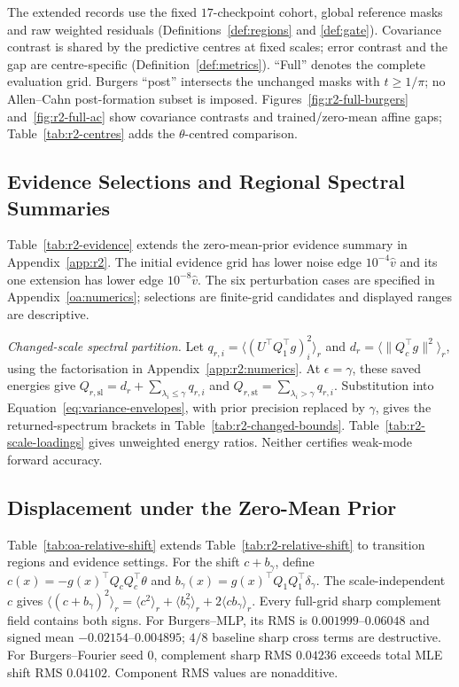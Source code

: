 The extended records use the fixed $17$-checkpoint cohort, global reference
masks and raw weighted residuals (Definitions~\ref{def:regions} and
\ref{def:gate}). Covariance contrast is shared by the predictive centres at fixed scales;
error contrast and the gap are centre-specific (Definition~\ref{def:metrics}).
``Full'' denotes the complete evaluation grid. Burgers ``post'' intersects the unchanged
masks with $t\ge1/\pi$; no Allen--Cahn post-formation subset is imposed.
Figures~\ref{fig:r2-full-burgers} and~\ref{fig:r2-full-ac} show covariance contrasts and
trained/zero-mean affine gaps; Table~\ref{tab:r2-centres} adds the $\theta$-centred comparison.

\subsection{Evidence Selections and Regional Spectral Summaries}
Table~\ref{tab:r2-evidence} extends the zero-mean-prior evidence summary in Appendix~\ref{app:r2}.
The initial evidence grid has lower noise edge $10^{-4}\widehat v$ and its one
extension has lower edge $10^{-8}\widehat v$. The six perturbation cases are specified in Appendix~\ref{oa:numerics}; selections
are finite-grid candidates and displayed ranges are descriptive.

\emph{Changed-scale spectral partition.}
Let $q_{r,i}=\langle(U^\top Q_1^\top g)_i^2\rangle_r$ and
$d_r=\langle\|Q_c^\top g\|^2\rangle_r$, using the factorisation in Appendix~\ref{app:r2:numerics}.
At $\epsilon=\gamma$, these saved energies give
$Q_{r,\mathrm{sl}}=d_r+\sum_{\lambda_i\le\gamma}q_{r,i}$ and
$Q_{r,\mathrm{st}}=\sum_{\lambda_i>\gamma}q_{r,i}$.
Substitution into Equation~\eqref{eq:variance-envelopes}, with prior precision
replaced by $\gamma$, gives the returned-spectrum brackets in
Table~\ref{tab:r2-changed-bounds}. Table~\ref{tab:r2-scale-loadings} gives unweighted
energy ratios. Neither certifies weak-mode forward accuracy.


\subsection{Displacement under the Zero-Mean Prior}
Table~\ref{tab:oa-relative-shift} extends Table~\ref{tab:r2-relative-shift} to transition
regions and evidence settings.
For the shift $c+b_\gamma$, define $c(x)=-g(x)^\top Q_cQ_c^\top\theta$ and
$b_\gamma(x)=g(x)^\top Q_1Q_1^\top\delta_\gamma$. The scale-independent $c$ gives
$\langle(c+b_\gamma)^2\rangle_r=\langle c^2\rangle_r+
\langle b_\gamma^2\rangle_r+2\langle cb_\gamma\rangle_r$.
Every full-grid sharp complement field contains both signs. For Burgers--MLP, its
RMS is $0.001999$--$0.06048$ and signed mean $-0.02154$--$0.004895$; $4/8$ baseline
sharp cross terms are destructive. For Burgers--Fourier seed $0$, complement sharp
RMS $0.04236$ exceeds total MLE shift RMS $0.04102$. Component RMS values are nonadditive.

